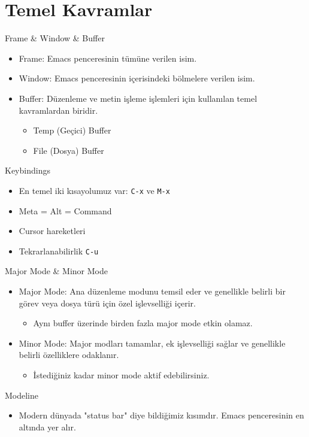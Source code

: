 \documentclass[presentation,smaller]{beamer}
\begin{document}
\section{Temel Kavramlar}
\label{sec:org0860636}
\begin{frame}[label={sec:org5150994}]{Frame \& Window \& Buffer}
\begin{itemize}
\item \alert{Frame}: Emacs penceresinin tümüne verilen isim.
\item \alert{Window}: Emacs penceresinin içerisindeki bölmelere verilen isim.
\item \alert{Buffer}: Düzenleme ve metin işleme işlemleri için kullanılan temel kavramlardan biridir.
\begin{itemize}
\item Temp (Geçici) Buffer
\item File (Dosya) Buffer
\end{itemize}
\end{itemize}
\end{frame}
\begin{frame}[label={sec:org4356753},fragile]{Keybindings}
 \begin{itemize}
\item En temel iki kısayolumuz var: \texttt{C-x} ve \texttt{M-x}
\item Meta = Alt = Command
\item Cursor hareketleri
\item Tekrarlanabilirlik \texttt{C-u}
\end{itemize}
\end{frame}
\begin{frame}[label={sec:org69e43df}]{Major Mode \& Minor Mode}
\begin{itemize}
\item \alert{Major Mode}: Ana düzenleme modunu temsil eder ve genellikle belirli bir görev
veya dosya türü için özel işlevselliği içerir.
\begin{itemize}
\item Aynı buffer üzerinde birden fazla major mode etkin olamaz.
\end{itemize}
\item \alert{Minor Mode}: Major modları tamamlar, ek işlevselliği sağlar ve genellikle
belirli özelliklere odaklanır.
\begin{itemize}
\item İstediğiniz kadar minor mode aktif edebilirsiniz.
\end{itemize}
\end{itemize}
\end{frame}
\begin{frame}[label={sec:orge892324}]{Modeline}
\begin{itemize}
\item Modern dünyada "status bar" diye bildiğimiz kısımdır. Emacs penceresinin en
altında yer alır.
\end{itemize}
\end{frame}
\end{document}
